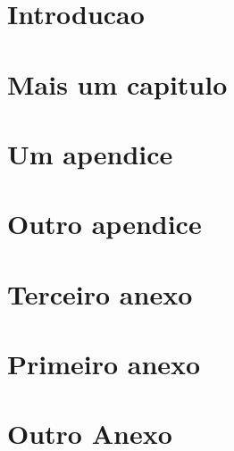 \documentclass{memoir}
\begin{document}
\tableofcontents

\chapter{Introducao}
\chapter{Mais um capitulo}

\appendix

\chapter{Um apendice}
\chapter{Outro apendice}
\chapter{Terceiro anexo}

%
%
%
{}
\renewcommand{\appendixname}{Anexo}

\chapter{Primeiro anexo}
\chapter{Outro Anexo}
\end{document}
